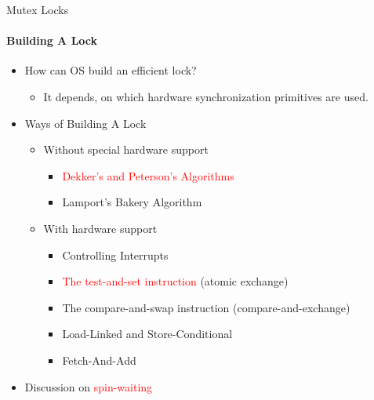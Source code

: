 \documentclass[10pt]{beamer}
\begin{document}
\begin{frame}{Mutex Locks}
\framesubtitle{Building A Lock}
\begin{itemize}
 
\item How can OS build an efficient lock? 
\begin{itemize}
\item It depends, on which hardware synchronization primitives are used.
\end{itemize}
\item Ways of Building A Lock
\begin{itemize}
\item Without special hardware support
\begin{itemize}
\item \textcolor{red}{Dekker's and Peterson's Algorithms}
\item Lamport's Bakery Algorithm
\end{itemize}
\item With hardware support
\begin{itemize}
\item Controlling Interrupts
\item \textcolor{red}{The test-and-set instruction} (atomic exchange)
\item The compare-and-swap instruction (compare-and-exchange)
\item \textcolor[rgb]{.5,.5,.5}{Load-Linked and Store-Conditional}
\item \textcolor[rgb]{.5,.5,.5}{Fetch-And-Add}
\end{itemize}
\end{itemize}
\item Discussion on \textcolor{red}{spin-waiting}  
\end{itemize}
\end{frame}
\end{document}
